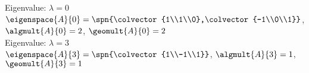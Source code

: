 Eigenvalue: $\lambda = 0$\\
$\eigenspace{A}{0} = \spn{\colvector{1\\1\\0},\colvector{-1\\0\\1}}$, $\algmult{A}{0} = 2$, $\geomult{A}{0} = 2$\\
Eigenvalue: $\lambda = 3$\\
$\eigenspace{A}{3} =\spn{\colvector{1\\-1\\1}}$, $\algmult{A}{3} = 1$, $\geomult{A}{3} = 1$
